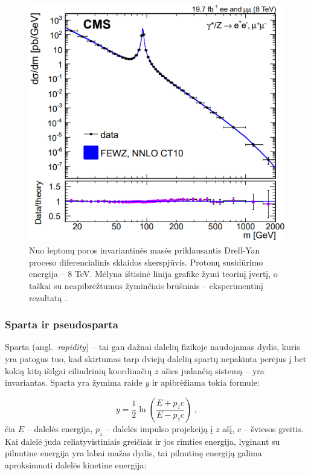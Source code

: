 \documentclass[a4paper, 12pt]{article}
\newlength\q
\begin{document}
\begin{centering}
\begin{figure}[H]
\centering
\includegraphics[scale=0.6]{DYeeCS.PNG}
\vspace{-0.2cm}
\caption{\label{fig:DYeeCS}
Nuo leptonų poros invariantinės masės priklausantis Drell-Yan proceso diferencialinis sklaidos skerspjūvis.
Protonų susidūrimo energija -- $8$ TeV.
Mėlyna ištisinė linija grafike žymi teorinį įvertį, o taškai su neapibrėžtumus žyminčiais brūšniais --
eksperimentinį rezultatą \cite{DYpic}.
}
\end{figure}
\end{centering}


\subsubsection*{Sparta ir pseudosparta}

Sparta (angl.\ \textit{rapidity}) -- tai gan dažnai dalelių fizikoje naudojamas dydis, kuris yra patogus tuo,
kad skirtumas tarp dviejų dalelių spartų nepakinta perėjus į bet kokią kitą išilgai cilindrinių koordinačių
$z$ ašies judančią sistemą -- yra invariantas.
Sparta yra žymima raide $y$ ir apibrėžiama tokia formule:

\begin{equation}
	y = \frac{1}{2} \ln{ \left( \frac{E+p_{z}c}{E-p_{z}c} \right) } \; \mathrm{,}
	\label{eq:rapidity}
\end{equation}
čia $E$ -- dalelės energija, $p_{z}$ -- dalelės impulso projekciją į $z$ ašį, $c$ -- šviesos greitis.
Kai dalelė juda reliatyvistiniais greičiais ir jos rimties energija, lyginant su pilnutine energija yra labai
mažas dydis, tai pilnutinę energiją galima aproksimuoti dalelės kinetine energija:
\end{document}
